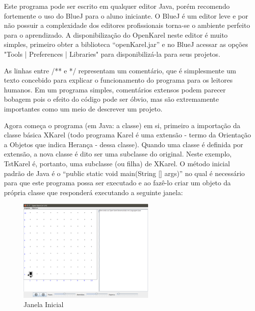 \documentclass[a4paper,11pt]{article}
\begin{document}
Este programa pode ser escrito em qualquer editor Java, porém recomendo fortemente o uso do BlueJ\cite{bluej} para o aluno iniciante. O BlueJ é um editor leve e por não possuir a complexidade dos editores profissionais torna-se o ambiente perfeito para o aprendizado. A disponibilização do OpenKarel neste editor é muito simples, primeiro obter a biblioteca ``openKarel.jar'' e no BlueJ acessar as opções "Tools | Preferences | Libraries" para disponibilizá-la para seus projetos.

As linhas entre /** e */ representam um comentário, que é simplesmente um texto concebido para explicar o funcionamento do programa para os leitores humanos. Em um programa simples, comentários extensos podem parecer bobagem pois o efeito do código pode ser óbvio, mas são extremamente importantes como um meio de descrever um projeto.

Agora começa o programa (em Java: a classe) em si, primeiro a importação da classe básica XKarel (todo programa Karel é uma extensão - termo da Orientação a Objetos que indica Herança - dessa classe). Quando uma classe é definida por extensão, a nova classe é dito ser uma subclasse do original. Neste exemplo, TstKarel é, portanto, uma subclasse (ou filha) de XKarel. O método inicial padrão de Java é o ``public static void main(String [] args)'' no qual é necessário para que este programa possa ser executado e ao fazê-lo criar um objeto da própria classe que responderá executando a seguinte janela:
\begin{figure}[H]
	\centering
	\includegraphics[width=0.6\textwidth]{imagem/janinicial.png}
	\caption{Janela Inicial}
\end{figure}
\end{document}
